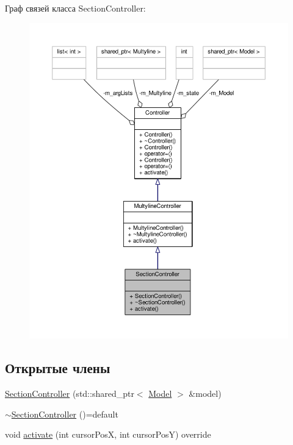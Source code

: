 Граф связей класса Section\-Controller\-:
\nopagebreak
\begin{figure}[H]
\begin{center}
\leavevmode
\includegraphics[width=350pt]{class_section_controller__coll__graph}
\end{center}
\end{figure}
\subsection*{Открытые члены}
\begin{DoxyCompactItemize}
\item 
\hyperlink{class_section_controller_a67316b2c4b0ca5c107108a9fa6104c99}{Section\-Controller} (std\-::shared\-\_\-ptr$<$ \hyperlink{class_model}{Model} $>$ \&model)
\item 
\hyperlink{class_section_controller_a33f3cd20b89d17016f066b47d03f9a47}{$\sim$\-Section\-Controller} ()=default
\item 
void \hyperlink{class_section_controller_ac42bb71f574f336a79a2e0a739fbad24}{activate} (int cursor\-Pos\-X, int cursor\-Pos\-Y) override
\end{DoxyCompactItemize}


